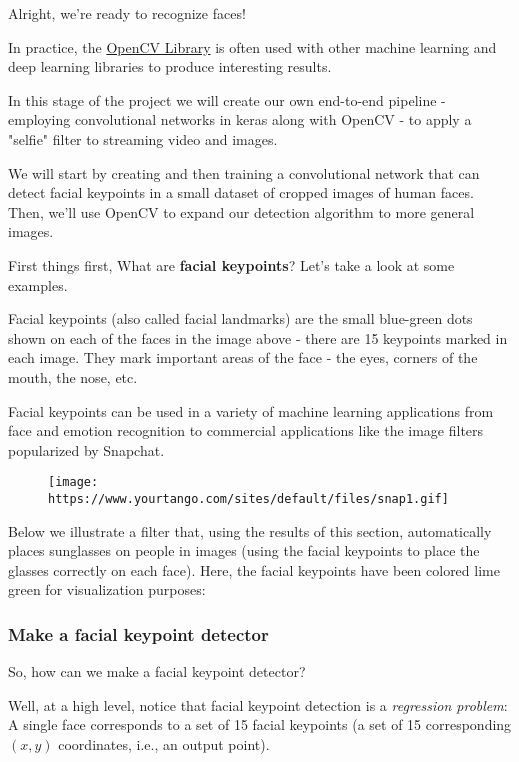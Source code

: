 \documentclass[11pt]{article}
\makeatletter
\def\maxwidth{\ifdim\Gin@nat@width>\linewidth\linewidth
    \else\Gin@nat@width\fi}
\let\Oldincludegraphics\includegraphics
\renewcommand{\includegraphics}[1]{\Oldincludegraphics[width=.8\maxwidth]{#1}}
\makeatother
\begin{document}
Alright, we're ready to recognize faces!

In practice, the \href{https://opencv.org/}{OpenCV Library} is often
used with other machine learning and deep learning libraries to produce
interesting results.

In this stage of the project we will create our own end-to-end pipeline
- employing convolutional networks in keras along with OpenCV - to apply
a "selfie" filter to streaming video and images.

We will start by creating and then training a convolutional network that
can detect facial keypoints in a small dataset of cropped images of
human faces. Then, we'll use OpenCV to expand our detection algorithm to
more general images.

First things first, What are \textbf{facial keypoints}? Let's take a
look at some examples.

Facial keypoints (also called facial landmarks) are the small blue-green
dots shown on each of the faces in the image above - there are 15
keypoints marked in each image. They mark important areas of the face -
the eyes, corners of the mouth, the nose, etc.

Facial keypoints can be used in a variety of machine learning
applications from face and emotion recognition to commercial
applications like the image filters popularized by Snapchat.

\begin{figure}
\centering
\texttt{[image: https://www.yourtango.com/sites/default/files/snap1.gif]}
\caption{}
\end{figure}

Below we illustrate a filter that, using the results of this section,
automatically places sunglasses on people in images (using the facial
keypoints to place the glasses correctly on each face). Here, the facial
keypoints have been colored lime green for visualization purposes:

    \subsubsection{Make a facial keypoint
detector}\label{make-a-facial-keypoint-detector}

So, how can we make a facial keypoint detector?

Well, at a high level, notice that facial keypoint detection is a
\emph{regression problem}: A single face corresponds to a set of 15
facial keypoints (a set of 15 corresponding \((x, y)\) coordinates,
i.e., an output point).
\end{document}
